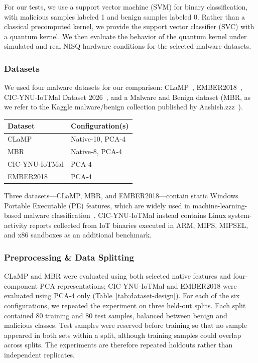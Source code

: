 \documentclass[letterpaper]{article} %
\begin{document}
For our tests, we use a support vector machine (SVM) for binary classification, with malicious samples labeled 1 and benign samples labeled 0. Rather than a classical precomputed kernel, we provide the support vector classifier (SVC) with a quantum kernel. We then evaluate the behavior of the quantum kernel under simulated and real NISQ hardware conditions for the selected malware datasets.

\subsubsection{Datasets}

We used four malware datasets for our comparison: CLaMP~\cite{clamp}, EMBER2018~\cite{ember2018}, CIC-YNU-IoTMal Dataset 2026~\cite{cic}, and a Malware and Benign dataset (MBR, as we refer to the Kaggle malware/benign collection published by Aashish.zzz~\cite{synthetic}).

\begin{center}
\label{tab:dataset-design}
\small
\begin{tabular}{ll}
\toprule
Dataset & Configuration(s) \\
\midrule
CLaMP & Native-10, PCA-4 \\
MBR & Native-8, PCA-4 \\
CIC-YNU-IoTMal & PCA-4 \\
EMBER2018 & PCA-4 \\
\bottomrule
\end{tabular}
\end{center}

Three datasets---CLaMP, MBR, and EMBER2018---contain static Windows Portable Executable (PE) features, which are widely used in machine-learning-based malware classification~\cite{ucci2019survey}. CIC-YNU-IoTMal instead contains Linux system-activity reports collected from IoT binaries executed in ARM, MIPS, MIPSEL, and x86 sandboxes as an additional benchmark.

\subsubsection{Preprocessing \& Data Splitting}
CLaMP and MBR were evaluated using both selected native features and four-component PCA representations; CIC-YNU-IoTMal and EMBER2018 were evaluated using PCA-4 only (Table~\ref{tab:dataset-design}). For each of the six configurations, we repeated the experiment on three held-out splits. Each split contained 80 training and 80 test samples, balanced between benign and malicious classes. Test samples were reserved before training so that no sample appeared in both sets within a split, although training samples could overlap across splits. The experiments are therefore repeated holdouts rather than independent replicates.
\end{document}
